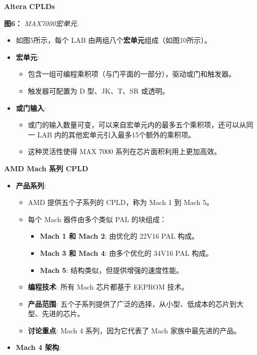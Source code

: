 \documentclass[
  ignorenonframetext,
  chinese,
]{beamer}
\providecommand{\tightlist}{%
  \setlength{\itemsep}{0pt}\setlength{\parskip}{0pt}}
\begin{document}
\begin{frame}
\begin{block}{\textbf{Altera CPLDs}}
\begin{itemize}
  \textbf{图6：} \emph{MAX7000宏单元.}

  \begin{itemize}
  \tightlist
  \item
    如图5所示，每个 LAB 由两组八个\textbf{宏单元}组成（如图10所示）。
  \item
    \textbf{宏单元}:

    \begin{itemize}
    \tightlist
    \item
      包含一组可编程乘积项（与门平面的一部分），驱动或门和触发器。
    \item
      触发器可配置为 D 型、JK、T、SR 或透明。
    \end{itemize}
  \item
    \textbf{或门输入}:

    \begin{itemize}
    \tightlist
    \item
      或门的输入数量可变，可以来自宏单元内的最多五个乘积项，还可以从同一
      LAB 内的其他宏单元引入最多15个额外的乘积项。
    \item
      这种灵活性使得 MAX 7000 系列在芯片面积利用上更加高效。
    \end{itemize}
  \end{itemize}
\end{itemize}
\end{block}

\begin{block}{\textbf{AMD Mach 系列 CPLD}}
\label{amd-mach-ux7cfbux5217-cpld}
\begin{itemize}
\tightlist
\item
  \textbf{产品系列}:

  \begin{itemize}
  \tightlist
  \item
    AMD 提供五个子系列的 CPLD，称为 Mach 1 到 Mach 5。
  \item
    每个 Mach 器件由多个类似 PAL 的块组成：

    \begin{itemize}
    \tightlist
    \item
      \textbf{Mach 1 和 Mach 2}: 由优化的 22V16 PAL 构成。
    \item
      \textbf{Mach 3 和 Mach 4}: 由多个优化的 34V16 PAL 构成。
    \item
      \textbf{Mach 5}: 结构类似，但提供增强的速度性能。
    \end{itemize}
  \item
    \textbf{编程技术}: 所有 Mach 芯片都基于 EEPROM 技术。
  \item
    \textbf{产品范围}:
    五个子系列提供了广泛的选择，从小型、低成本的芯片到大型、先进的芯片。
  \item
    \textbf{讨论重点}: Mach 4 系列，因为它代表了 Mach
    家族中最先进的产品。
  \end{itemize}
\item
  \textbf{Mach 4 架构}:


\end{itemize}
\end{block}
\end{frame}
\end{document}
